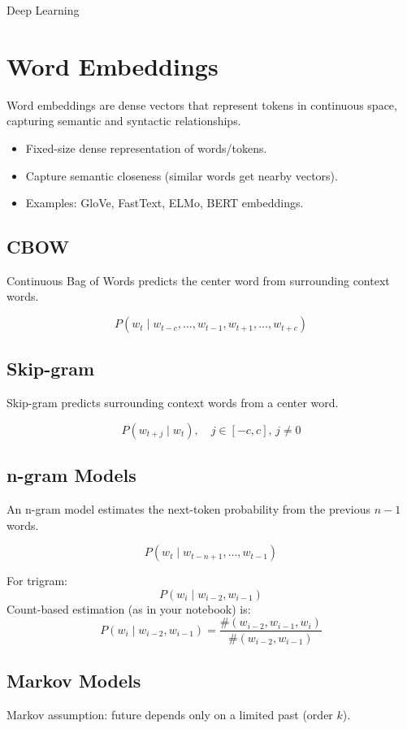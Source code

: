 \documentclass[10pt,a4paper]{article}
\newcommand{\NoteTitle}{Deep Learning}
\newcommand{\NoteAuthor}{Thomaskutty Reji}
\begin{document}
\begin{titlepage}
  \vspace*{0.25\textheight}
  {\LARGE \textcolor{tocblue}{\NoteTitle}}\par
  \author{\NoteAuthor}
  \date{}
\end{titlepage}

\label{toc}
\tableofcontents
\newpage
\section{Word Embeddings}
Word embeddings are dense vectors that represent tokens in continuous space, capturing semantic and syntactic relationships.
\begin{itemize}
    \item Fixed-size dense representation of words/tokens.
    \item Capture semantic closeness (similar words get nearby vectors).
    \item Examples: GloVe, FastText, ELMo, BERT embeddings.
\end{itemize}

\subsection{CBOW}
Continuous Bag of Words predicts the center word from surrounding context words.

\[
P(w_t \mid w_{t-c},\ldots,w_{t-1},w_{t+1},\ldots,w_{t+c})
\]

\subsection{Skip-gram}
Skip-gram predicts surrounding context words from a center word.

\[
P(w_{t+j}\mid w_t), \quad j\in[-c,c],\,j\neq 0
\]


\subsection{n-gram Models}
An n-gram model estimates the next-token probability from the previous $n-1$ words.

\[
P(w_t\mid w_{t-n+1},\ldots,w_{t-1})
\]

For trigram:
\[
P(w_i\mid w_{i-2},w_{i-1})
\]
Count-based estimation (as in your notebook) is:
\[
P(w_i\mid w_{i-2},w_{i-1})=\frac{\#(w_{i-2},w_{i-1},w_i)}{\#(w_{i-2},w_{i-1})}
\]

\subsection{Markov Models}
Markov assumption: future depends only on a limited past (order $k$).
\end{document}

